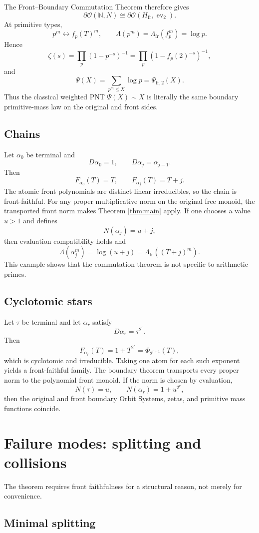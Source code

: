 \documentclass[11pt]{article}
\newcommand{\NN}{\mathbb N}
\newcommand{\cO}{\mathcal O}
\newcommand{\fr}{\mathrm{fr}}
\newcommand{\bd}{\partial}
\newcommand{\Lam}{\Lambda}
\begin{document}
The Front--Boundary Commutation Theorem therefore gives
\[
\bd\cO(\NN,N)
\cong
\bd\cO(H_{\fr},\operatorname{ev}_2).
\]
At primitive types,
\[
p^m\longleftrightarrow f_p(T)^m,
\qquad
\Lam(p^m)=\Lam_{\fr}(f_p^m)=\log p.
\]
Hence
\[
\zeta(s)
=
\prod_p(1-p^{-s})^{-1}
=
\prod_p(1-f_p(2)^{-s})^{-1},
\]
and
\[
\Psi(X)
=
\sum_{p^m\le X}\log p
=
\Psi_{\fr,2}(X).
\]
Thus the classical weighted PNT $\Psi(X)\sim X$ is literally the same boundary primitive-mass law on the original and front sides.

\subsection{Chains}

Let $\alpha_0$ be terminal and
\[
D\alpha_0=1,\qquad D\alpha_j=\alpha_{j-1}.
\]
Then
\[
F_{\alpha_0}(T)=T,\qquad
F_{\alpha_j}(T)=T+j.
\]
The atomic front polynomials are distinct linear irreducibles, so the chain is front-faithful. For any proper multiplicative norm on the original free monoid, the transported front norm makes Theorem \ref{thm:main} apply. If one chooses a value $u>1$ and defines
\[
N(\alpha_j)=u+j,
\]
then evaluation compatibility holds and
\[
\Lam(\alpha_j^m)=\log(u+j)
=
\Lam_{\fr}((T+j)^m).
\]
This example shows that the commutation theorem is not specific to arithmetic primes.

\subsection{Cyclotomic stars}

Let $\tau$ be terminal and let $\alpha_r$ satisfy
\[
D\alpha_r=\tau^{2^r}.
\]
Then
\[
F_{\alpha_r}(T)=1+T^{2^r}
=\Phi_{2^{r+1}}(T),
\]
which is cyclotomic and irreducible. Taking one atom for each such exponent yields a front-faithful family. The boundary theorem transports every proper norm to the polynomial front monoid. If the norm is chosen by evaluation,
\[
N(\tau)=u,\qquad
N(\alpha_r)=1+u^{2^r},
\]
then the original and front boundary Orbit Systems, zetas, and primitive mass functions coincide.

\section{Failure modes: splitting and collisions}

The theorem requires front faithfulness for a structural reason, not merely for convenience.

\subsection{Minimal splitting}
\end{document}
